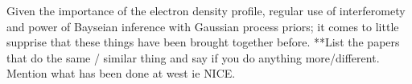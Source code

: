 Given the importance of the electron density profile, regular use of interferomety and power of Bayseian inference with Gaussian process priors; it comes to little supprise that these things have been brought together before. **List the papers that do the same / similar thing and say if you do anything more/different. Mention what has been done at west ie NICE. 













